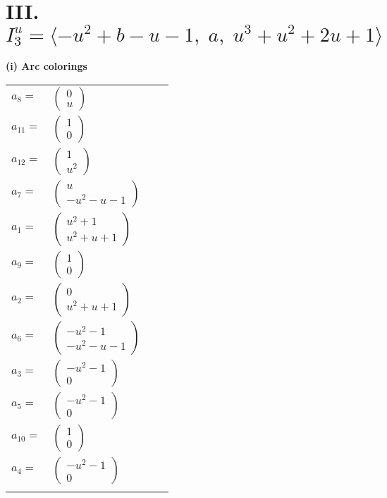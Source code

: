 \documentclass[1p]{elsarticle_modified}
\theoremstyle{definition}
\begin{document}
\centering \section*{III. $I^u_{3}= \langle - u^2+b- u-1,\;a,\;u^3+u^2+2 u+1 \rangle$}
\flushleft \textbf{(i) Arc colorings}\\
\begin{tabular}{m{7pt} m{180pt} m{7pt} m{180pt} }
\flushright $a_{8}=$&$\begin{pmatrix}0\\u\end{pmatrix}$ \\
\flushright $a_{11}=$&$\begin{pmatrix}1\\0\end{pmatrix}$ \\
\flushright $a_{12}=$&$\begin{pmatrix}1\\u^2\end{pmatrix}$ \\
\flushright $a_{7}=$&$\begin{pmatrix}u\\- u^2- u-1\end{pmatrix}$ \\
\flushright $a_{1}=$&$\begin{pmatrix}u^2+1\\u^2+u+1\end{pmatrix}$ \\
\flushright $a_{9}=$&$\begin{pmatrix}1\\0\end{pmatrix}$ \\
\flushright $a_{2}=$&$\begin{pmatrix}0\\u^2+u+1\end{pmatrix}$ \\
\flushright $a_{6}=$&$\begin{pmatrix}- u^2-1\\- u^2- u-1\end{pmatrix}$ \\
\flushright $a_{3}=$&$\begin{pmatrix}- u^2-1\\0\end{pmatrix}$ \\
\flushright $a_{5}=$&$\begin{pmatrix}- u^2-1\\0\end{pmatrix}$ \\
\flushright $a_{10}=$&$\begin{pmatrix}1\\0\end{pmatrix}$ \\
\flushright $a_{4}=$&$\begin{pmatrix}- u^2-1\\0\end{pmatrix}$\\&\end{tabular}
\end{document}
